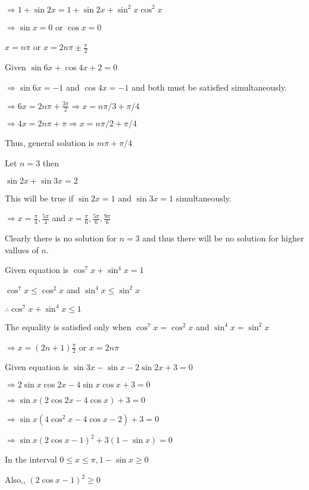   $\Rightarrow 1 + \sin 2x = 1 + \sin 2x + \sin^2x\cos^2x$

  $\Rightarrow \sin x = 0$ or $\cos x = 0$

  $x = n\pi$ or $x = 2n\pi \pm \frac{\pi}{2}$

\item Given $\sin 6x + \cos4x + 2 = 0$

  $\Rightarrow \sin6x = -1$ and $\cos4x=-1$ and both must be satisfied simultaneously.

  $\Rightarrow 6x = 2n\pi + \frac{3\pi}{2} \Rightarrow x = n\pi/3 + \pi/4$

  $\Rightarrow 4x = 2n\pi + \pi \Rightarrow x = n\pi/2 + \pi/4$

  Thus, general solution is $m\pi + \pi/4$

\item Let $n = 3$ then

  $\sin 2x + \sin 3x = 2$

  This will be true if $\sin 2x = 1$ and $\sin3x =1$ simultaneously.

  $\Rightarrow x = \frac{\pi}{4}, \frac{5\pi}{4}$ and $x = \frac{\pi}{6}, \frac{5\pi}{6}, \frac{9\pi}{6}$

  Clearly there is no solution for $n =3$ and thus there will be no solution for higher vallues of $n.$

\item Given equation is $\cos^7x + \sin^4x = 1$

  $\cos^7x \leq \cos^2x$ and $\sin^4x\leq \sin^2x$

  $\therefore \cos^7x + \sin^4x \leq 1$

  The equality is satisfied only when $\cos^7x = \cos^2x$ and $\sin^4x = \sin^2x$

  $\Rightarrow x = (2n + 1)\frac{\pi}{2}$ or $x = 2n\pi$

\item Given equation is $\sin3x -\sin x -2\sin2x + 3 = 0$

  $\Rightarrow 2\sin x\cos2x - 4\sin x\cos x + 3 = 0$

  $\Rightarrow \sin x(2\cos2x - 4\cos x) + 3 = 0$

  $\Rightarrow \sin x(4\cos^2x - 4\cos x -2) + 3 = 0$

  $\Rightarrow \sin x(2\cos x - 1)^2 + 3(1 - \sin x) = 0$

  In the interval $0\leq x\leq \pi, 1 - \sin x\geq 0$

  Also,, $(2\cos x - 1)^2\geq 0$

